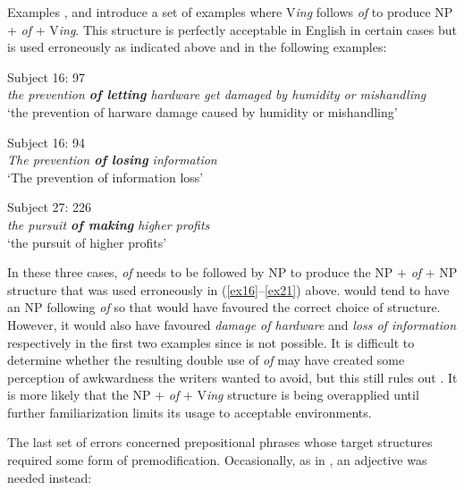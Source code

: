 \documentclass[output=paper]{langsci/langscibook}
\begin{document}
Examples ,  and  introduce a set of examples where
V\textit{ing} follows \textit{of} to produce NP + \textit{of} +
V\textit{ing}. This structure is perfectly acceptable in English in
certain cases but is used erroneously as indicated above and in the
following examples:

\begin{exe}  
  \ex{}
  {Subject 16: 97}\\
    \textit{the prevention \textbf{of letting} hardware get damaged by humidity or mishandling}\\
    {‘the prevention of harware damage caused by humidity or mishandling’}
  \label{ex25}
\end{exe}

\begin{exe}  
  \ex{}
  {Subject 16: 94}\\
    \textit{The prevention \textbf{of losing} information}\\
    {‘The prevention of information loss’}
  \label{ex26}
\end{exe}

\begin{exe}  
  \ex{}
  {Subject 27: 226}\\
    \textit{the pursuit \textbf{of making} higher profits}\\
    {‘the pursuit of higher profits’}
  \label{ex27}
\end{exe}


In these three cases, \textit{of} needs to be followed by NP to
produce the NP + \textit{of} + NP structure that was used erroneously
in (\ref{ex16}--\ref{ex21}) above.  would tend to have an NP following
\textit{of} so that  would have favoured the correct
choice of structure. However, it would also have favoured
\textit{damage of hardware} and \textit{loss of information}
respectively in the first two examples since  is not
possible. It is difficult to determine whether the resulting double
use of \textit{of} may have created some perception of awkwardness the
writers wanted to avoid, but this still rules out . It
is more likely that the NP + \textit{of} + V\textit{ing} structure is
being overapplied until further familiarization limits its usage to acceptable environments.



The last set of errors concerned  prepositional phrases
whose target structures required some form of
premodification. Occasionally, as in , an adjective was needed
instead:
\end{document}

